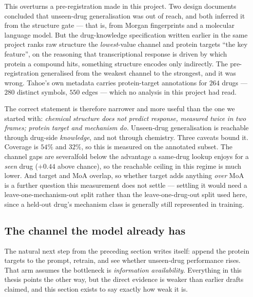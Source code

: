 This overturns a pre-registration made in this project. Two design documents concluded that
unseen-drug generalisation was out of reach, and both inferred it from the structure gate --- that
is, from Morgan fingerprints and a molecular language model. But the drug-knowledge specification
written earlier in the same project ranks raw structure the \emph{lowest}-value channel and protein
targets ``the key feature'', on the reasoning that transcriptional response is driven by which
protein a compound hits, something structure encodes only indirectly. The pre-registration
generalised from the weakest channel to the strongest, and it was wrong. Tahoe's own metadata
carries protein-target annotations for $264$ drugs --- $280$ distinct symbols, $550$ edges ---
which no analysis in this project had read.

The correct statement is therefore narrower and more useful than the one we started with:
\emph{chemical structure does not predict response, measured twice in two frames; protein target
and mechanism do.} Unseen-drug generalisation is reachable through drug-side \emph{knowledge}, and
not through chemistry. Three caveats bound it. Coverage is $54\%$ and $32\%$, so this is measured
on the annotated subset. The channel gaps are severalfold below the advantage a same-drug lookup
enjoys for a \emph{seen} drug ($+0.44$ above chance), so the reachable ceiling in this regime is
much lower. And
target and MoA overlap, so whether target adds anything \emph{over} MoA is a further question this
measurement does not settle --- settling it would need a leave-one-mechanism-out split rather than
the leave-one-drug-out split used here, since a held-out drug's mechanism class is generally still
represented in training.

\subsection{The channel the model already has}
\label{sec:res-field}

The natural next step from the preceding section writes itself: append the protein targets to the
prompt, retrain, and see whether unseen-drug performance rises. That arm assumes the bottleneck is
\emph{information availability}. Everything in this thesis points the other way, but the direct
evidence is weaker than earlier drafts claimed, and this section exists to say exactly how weak it
is.

